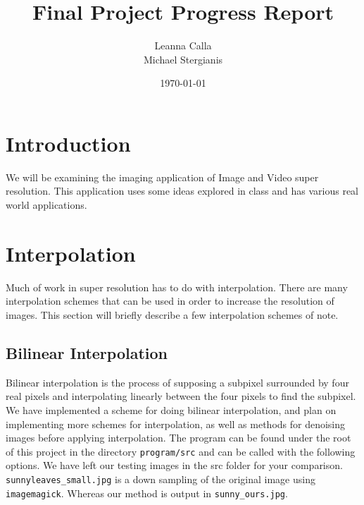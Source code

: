 \documentclass{article}
\title{Final Project Progress Report}
\author{Leanna Calla\\Michael Stergianis}
\date{\today}
\begin{document}
\maketitle

\section{Introduction}
We will be examining the imaging application of Image and Video super
resolution. This application uses some ideas explored
in class and has various real world applications. 
\section{Interpolation}
\label{sec:interpolation}
Much of work in super resolution has to do with interpolation.  There
are many interpolation schemes that can be used in order to increase
the resolution of images. This section will briefly describe a few
interpolation schemes of note.
%
\subsection{Bilinear Interpolation}
\label{subsec:bilinear}
Bilinear interpolation is the process of supposing a subpixel
surrounded by four real pixels and interpolating linearly between the
four pixels to find the subpixel. We have implemented a scheme for
doing bilinear interpolation, and plan on implementing more schemes
for interpolation, as well as methods for denoising images before
applying interpolation. The program can be found under the root of
this project in the directory \texttt{program/src} and can be called with
the following options.
  We have left our testing images in the src folder for your
  comparison. \texttt{sunnyleaves\_small.jpg} is a down sampling of the
  original image using \texttt{imagemagick}. Whereas our method is
  output in \texttt{sunny\_ours.jpg}.
%
%
\end{document}
